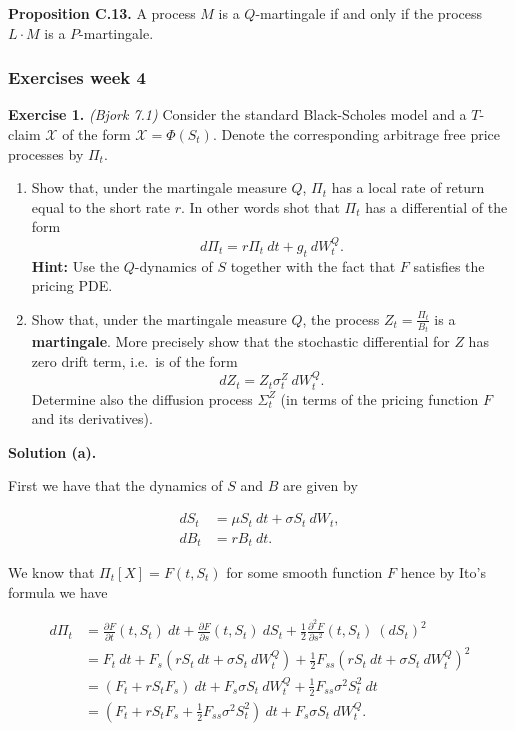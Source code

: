 \documentclass[
]{article}
\providecommand{\tightlist}{%
  \setlength{\itemsep}{0pt}\setlength{\parskip}{0pt}}
\begin{document}
\textbf{Proposition C.13.} A process \(M\) is a \(Q\)-martingale if and
only if the process \(L\cdot M\) is a \(P\)-martingale.

\hypertarget{exercises-week-4}{%
\subsubsection{Exercises week 4}\label{exercises-week-4}}

\textbf{Exercise 1.} \emph{(Bjork 7.1)} Consider the standard
Black-Scholes model and a \(T\)-claim \(\mathcal{X}\) of the form
\(\mathcal{X}=\Phi(S_t)\). Denote the corresponding arbitrage free price
processes by \(\Pi_t\).

\begin{enumerate}
\def\labelenumi{\alph{enumi}.}
\tightlist
\item
  Show that, under the martingale measure \(Q\), \(\Pi_t\) has a local
  rate of return equal to the short rate \(r\). In other words shot that
  \(\Pi_t\) has a differential of the form \[
    d\Pi_t=r\Pi_t\ dt+g_t\ dW_t^Q.
    \] \textbf{Hint:} Use the \(Q\)-dynamics of \(S\) together with the
  fact that \(F\) satisfies the pricing PDE.
\item
  Show that, under the martingale measure \(Q\), the process
  \(Z_t=\frac{\Pi_t}{B_t}\) is a \textbf{martingale}. More precisely
  show that the stochastic differential for \(Z\) has zero drift term,
  i.e.~is of the form \[
    dZ_t=Z_t\sigma_t^Z\ dW_t^Q.
    \] Determine also the diffusion process \(\Sigma_t^Z\) (in terms of
  the pricing function \(F\) and its derivatives).
\end{enumerate}

\textbf{Solution (a).}

First we have that the dynamics of \(S\) and \(B\) are given by

\begin{align*}
dS_t&=\mu S_t\ dt + \sigma S_t\ dW_t,\\
dB_t&=rB_t\ dt.
\end{align*}

We know that \(\Pi_t[X]=F(t,S_t)\) for some smooth function \(F\) hence
by Ito's formula we have

\begin{align*}
d\Pi_t&=\frac{\partial F}{\partial t}(t,S_t)\ dt +\frac{\partial F}{\partial s}(t,S_t)\ dS_t+\frac{1}{2}\frac{\partial^2 F}{\partial s^2}(t,S_t)\ (dS_t)^2\\
&=F_t\ dt+F_s(r S_t\ dt + \sigma S_t\ dW^Q_t)+\frac{1}{2}F_{ss}(r S_t\ dt + \sigma S_t\ dW^Q_t)^2\\
&=(F_t+r S_t F_s)\ dt+F_s\sigma S_t\ dW^Q_t+\frac{1}{2}F_{ss}\sigma ^2S_t^2\ dt\\
&=(F_t+r S_tF_s+\frac{1}{2}F_{ss}\sigma ^2S_t^2)\ dt+F_s\sigma S_t\ dW^   Q_t.
\end{align*}
\end{document}
